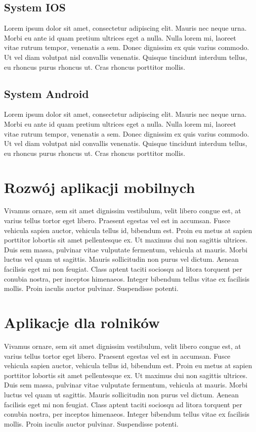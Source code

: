 \documentclass[a4paper,12pt,oneside]{book}
\begin{document}
	\subsection{System IOS}
	Lorem ipsum dolor sit amet, consectetur adipiscing elit. Mauris nec neque urna. Morbi eu ante id quam pretium ultrices eget a nulla. Nulla lorem mi, laoreet vitae rutrum tempor, venenatis a sem. Donec dignissim ex quis varius commodo. Ut vel diam volutpat nisl convallis venenatis. Quisque tincidunt interdum tellus, eu rhoncus purus rhoncus ut. Cras rhoncus porttitor mollis.
	
	\subsection{System Android}
	Lorem ipsum dolor sit amet, consectetur adipiscing elit. Mauris nec neque urna. Morbi eu ante id quam pretium ultrices eget a nulla. Nulla lorem mi, laoreet vitae rutrum tempor, venenatis a sem. Donec dignissim ex quis varius commodo. Ut vel diam volutpat nisl convallis venenatis. Quisque tincidunt interdum tellus, eu rhoncus purus rhoncus ut. Cras rhoncus porttitor mollis.
	
	\newpage
	\section{Rozwój aplikacji mobilnych}
	Vivamus ornare, sem sit amet dignissim vestibulum, velit libero congue est, at varius tellus tortor eget libero. Praesent egestas vel est in accumsan. Fusce vehicula sapien auctor, vehicula tellus id, bibendum est. Proin eu metus at sapien porttitor lobortis sit amet pellentesque ex. Ut maximus dui non sagittis ultrices. Duis sem massa, pulvinar vitae vulputate fermentum, vehicula at mauris. Morbi luctus vel quam ut sagittis. Mauris sollicitudin non purus vel dictum. Aenean facilisis eget mi non feugiat. Class aptent taciti sociosqu ad litora torquent per conubia nostra, per inceptos himenaeos. Integer bibendum tellus vitae ex facilisis mollis. Proin iaculis auctor pulvinar. Suspendisse potenti.
	\section{Aplikacje dla rolników}
	Vivamus ornare, sem sit amet dignissim vestibulum, velit libero congue est, at varius tellus tortor eget libero. Praesent egestas vel est in accumsan. Fusce vehicula sapien auctor, vehicula tellus id, bibendum est. Proin eu metus at sapien porttitor lobortis sit amet pellentesque ex. Ut maximus dui non sagittis ultrices. Duis sem massa, pulvinar vitae vulputate fermentum, vehicula at mauris. Morbi luctus vel quam ut sagittis. Mauris sollicitudin non purus vel dictum. Aenean facilisis eget mi non feugiat. Class aptent taciti sociosqu ad litora torquent per conubia nostra, per inceptos himenaeos. Integer bibendum tellus vitae ex facilisis mollis. Proin iaculis auctor pulvinar. Suspendisse potenti.
	
\end{document}

